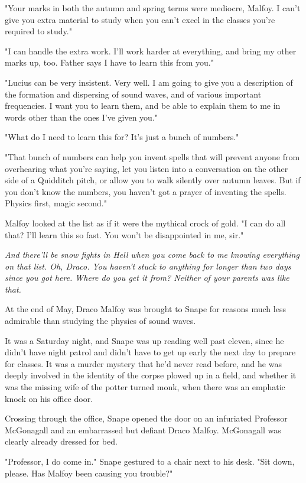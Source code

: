 "Your marks in both the autumn and spring terms were mediocre, Malfoy. I can't give you extra material to study when you can't excel in the classes you're required to study."

"I can handle the extra work. I'll work harder at everything, and bring my other marks up, too. Father says I have to learn this from you."

"Lucius can be{\el} very insistent. Very well. I am going to give you a description of the formation and dispersing of sound waves, and of various important frequencies. I want you to learn them, and be able to explain them to me in words other than the ones I've given you."

"What do I need to learn this for? It's just a bunch of numbers."

"That bunch of numbers can help you invent spells that will prevent anyone from overhearing what you're saying, let you listen into a conversation on the other side of a Quidditch pitch, or allow you to walk silently over autumn leaves. But if you don't know the numbers, you haven't got a prayer of inventing the spells. Physics first, magic second."

Malfoy looked at the list as if it were the mythical crock of gold. "I can do all that? I'll learn this so fast. You won't be disappointed in me, sir."

\emph{And there'll be snow fights in Hell when you come back to me knowing everything on that list. Oh, Draco. You haven't stuck to anything for longer than two days since you got here. Where do you get it from? Neither of your parents was like that.}

At the end of May, Draco Malfoy was brought to Snape for reasons much less admirable than studying the physics of sound waves.

It was a Saturday night, and Snape was up reading well past eleven, since he didn't have night patrol and didn't have to get up early the next day to prepare for classes. It was a murder mystery that he'd never read before, and he was deeply involved in the identity of the corpse plowed up in a field, and whether it was the missing wife of the potter turned monk, when there was an emphatic knock on his office door.

Crossing through the office, Snape opened the door on an infuriated Professor McGonagall and an embarrassed but defiant Draco Malfoy. McGonagall was clearly already dressed for bed.

"Professor, I{\el} do come in." Snape gestured to a chair next to his desk. "Sit down, please. Has Malfoy been causing you trouble?"

